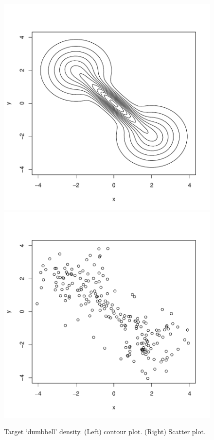 \documentclass[a4paper,11pt]{article}
\begin{document}
\begin{figure}[!ht]
\begin{center}
\includegraphics{kde-002}
\includegraphics{kde-003}
\end{center}
\caption{Target `dumbbell' density. (Left) contour plot. (Right) Scatter plot.}
\label{fig:dens-db}
\end{figure}
\end{document}
